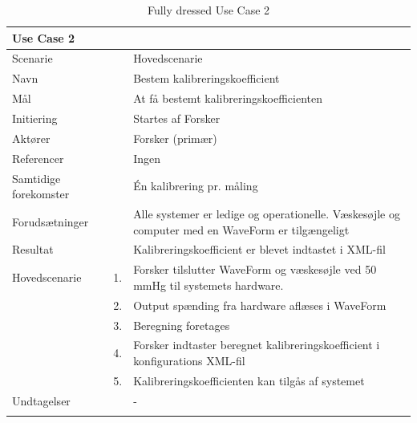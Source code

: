 \begin{longtabu} to  %
	{\large \textbf{Use Case 2}} && \\
	\toprule
	Scenarie && Hovedscenarie\\
	Navn && Bestem kalibreringskoefficient\\
	Mål && At få bestemt kalibreringskoefficienten\\
	Initiering && Startes af Forsker\\
	Aktører && Forsker (primær)\\
	Referencer && Ingen\\
	Samtidige forekomster  && Én kalibrering pr. måling\\
	Forudsætninger && Alle systemer er ledige og operationelle. Væskesøjle og computer med en WaveForm er tilgængeligt\\ 
	Resultat && Kalibreringskoefficient er blevet indtastet i XML-fil\\ \midrule
	Hovedscenarie &    1. &		Forsker tilslutter WaveForm og væskesøjle ved 50 mmHg til systemets hardware.\\[-1ex]
	&     2. & 	Output spænding fra hardware aflæses i WaveForm\\	 	
	&    3. & Beregning foretages\\[-1ex]
	&    4. & Forsker indtaster beregnet kalibreringskoefficient i konfigurations XML-fil\\[-1ex] 
	&    5. & Kalibreringskoefficienten kan tilgås af systemet\\ \midrule
	
	Undtagelser && - \\ 
	\bottomrule
	\caption{Fully dressed Use Case 2}
	\label{UC2}
\end{longtabu}

